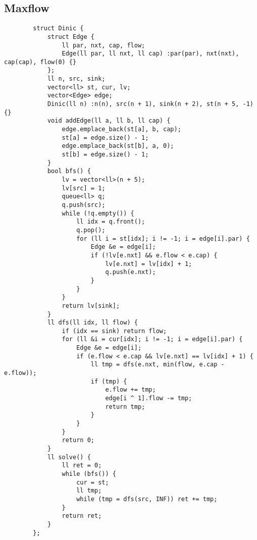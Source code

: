 \documentclass[landscape, 8pt, a4paper, oneside, twocolumn]{extarticle}
\begin{document}
	\subsection{Maxflow}
	\begin{verbatim}
		struct Dinic {
			struct Edge {
				ll par, nxt, cap, flow;
				Edge(ll par, ll nxt, ll cap) :par(par), nxt(nxt), cap(cap), flow(0) {}
			};
			ll n, src, sink;
			vector<ll> st, cur, lv;
			vector<Edge> edge;
			Dinic(ll n) :n(n), src(n + 1), sink(n + 2), st(n + 5, -1) {}
			void addEdge(ll a, ll b, ll cap) {
				edge.emplace_back(st[a], b, cap);
				st[a] = edge.size() - 1;
				edge.emplace_back(st[b], a, 0);
				st[b] = edge.size() - 1;
			}
			bool bfs() {
				lv = vector<ll>(n + 5);
				lv[src] = 1;
				queue<ll> q;
				q.push(src);
				while (!q.empty()) {
					ll idx = q.front();
					q.pop();
					for (ll i = st[idx]; i != -1; i = edge[i].par) {
						Edge &e = edge[i];
						if (!lv[e.nxt] && e.flow < e.cap) {
							lv[e.nxt] = lv[idx] + 1;
							q.push(e.nxt);
						}
					}
				}
				return lv[sink];
			}
			ll dfs(ll idx, ll flow) {
				if (idx == sink) return flow;
				for (ll &i = cur[idx]; i != -1; i = edge[i].par) {
					Edge &e = edge[i];
					if (e.flow < e.cap && lv[e.nxt] == lv[idx] + 1) {
						ll tmp = dfs(e.nxt, min(flow, e.cap - e.flow));
						if (tmp) {
							e.flow += tmp;
							edge[i ^ 1].flow -= tmp;
							return tmp;
						}
					}
				}
				return 0;
			}
			ll solve() {
				ll ret = 0;
				while (bfs()) {
					cur = st;
					ll tmp;
					while (tmp = dfs(src, INF)) ret += tmp;
				}
				return ret;
			}
		};
	\end{verbatim}
\end{document}
